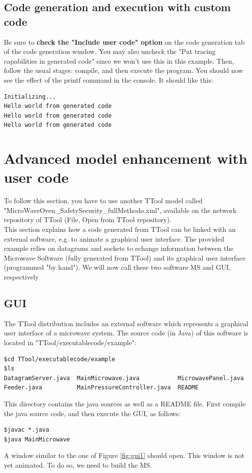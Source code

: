 \documentclass[12pt]{article}
\begin{document}
\subsection{Code generation and execution with custom code}

Be sure to \textbf{check the "Include user code" option} on the code generation tab of the code generation window. You may also uncheck the "Put tracing capabilities in generated code" since we won't use this in this example. Then, follow the usual stages: compile, and then execute the program. You should now see the effect of the printf command in the console. It should like this:
\begin{lstlisting}
Initializing...
Hello world from generated code
Hello world from generated code
Hello world from generated code
\end{lstlisting}

\newpage
\section{Advanced model enhancement with user code}\label{sec:advanced}
To follow this section, you have to use another TTool model called "MicroWaveOven\_SafetySecurity\_fullMethodo.xml", available on the network repository of TTool (File, Open from TTool repository).\\
This section explains how a code generated from TTool can be linked with an external software, e.g. to animate a graphical user interface. The provided example relies on datagrams and sockets to echange information between the Microwave Software (fully generated from TTool) and its graphical user interface (programmed "by hand"). We will now call these two software MS and GUI, respectively

\subsection{GUI}
The TTool distribution includes an external software which represents a graphical user interface of a microwave system. The source code (in Java) of this software is located in "TTool/executablecode/example":
\begin{lstlisting}
$cd TTool/executablecode/example
$ls
DatagramServer.java  MainMicrowave.java           MicrowavePanel.java
Feeder.java          MainPressureController.java  README
\end{lstlisting}
This directory contains the java sources as well as a README file. First compile the java source code, and then execute the GUI, as follows:
\begin{lstlisting}
$javac *.java
$java MainMicrowave
\end{lstlisting}
A window similar to the one of Figure \ref{fig:gui1} should open. This window is not yet animated. To do so, we need to build the MS.
\end{document}

